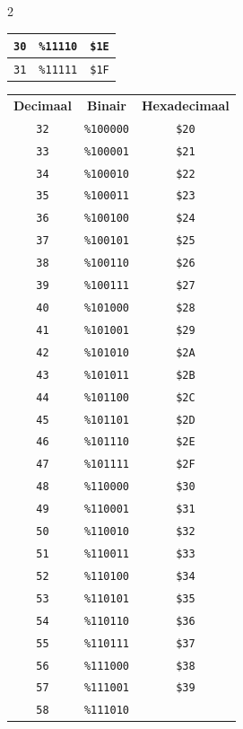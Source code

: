 \begin{multicols}{2}
\begin{center}
\begin{tabular}{|c|c|c|}
\texttt{30} & \texttt{\%11110} &  \texttt{\$1E} \\ \hline  \texttt{31} & \texttt{\%11111} &  \texttt{\$1F} \\ \hline
  	\end{tabular}
  \end{center}

\begin{center}
  \begin{tabular}{|c|c|c|}
  \hline
		\textbf{Decimaal} & \textbf{Binair} & \textbf{Hexadecimaal} \\ \hhline{|=|=|=|}    \texttt{32} & \texttt{\%100000} &  \texttt{\$20} \\ \hline \texttt{33} & \texttt{\%100001} &  \texttt{\$21} \\ \hline \texttt{34} & \texttt{\%100010} &  \texttt{\$22} \\ \hline \texttt{35} & \texttt{\%100011} &  \texttt{\$23} \\ \hline \texttt{36} & \texttt{\%100100} &  \texttt{\$24} \\ \hline \texttt{37} & \texttt{\%100101} &  \texttt{\$25} \\ \hline \texttt{38} & \texttt{\%100110} &  \texttt{\$26} \\ \hline \texttt{39} & \texttt{\%100111} &  \texttt{\$27} \\ \hline \texttt{40} & \texttt{\%101000} &  \texttt{\$28} \\ \hline \texttt{41} & \texttt{\%101001} &  \texttt{\$29} \\ \hline \texttt{42} & \texttt{\%101010} &  \texttt{\$2A} \\ \hline \texttt{43} & \texttt{\%101011} &  \texttt{\$2B} \\ \hline \texttt{44} & \texttt{\%101100} &  \texttt{\$2C} \\ \hline \texttt{45} & \texttt{\%101101} &  \texttt{\$2D} \\ \hline \texttt{46} & \texttt{\%101110} &  \texttt{\$2E} \\ \hline \texttt{47} & \texttt{\%101111} &  \texttt{\$2F} \\ \hline \texttt{48} & \texttt{\%110000} &  \texttt{\$30} \\ \hline \texttt{49} & \texttt{\%110001} &  \texttt{\$31} \\ \hline \texttt{50} & \texttt{\%110010} &  \texttt{\$32} \\ \hline \texttt{51} & \texttt{\%110011} &  \texttt{\$33} \\ \hline \texttt{52} & \texttt{\%110100} &  \texttt{\$34} \\ \hline \texttt{53} & \texttt{\%110101} &  \texttt{\$35} \\ \hline \texttt{54} & \texttt{\%110110} &  \texttt{\$36} \\ \hline \texttt{55} & \texttt{\%110111} &  \texttt{\$37} \\ \hline \texttt{56} & \texttt{\%111000} &  \texttt{\$38} \\ \hline \texttt{57} & \texttt{\%111001} &  \texttt{\$39} \\ \hline \texttt{58} & \texttt{\%111010} &  
\end{tabular}
\end{center}
\end{multicols}
